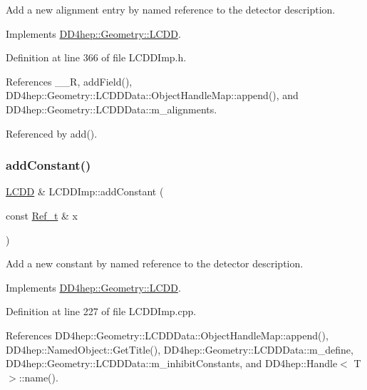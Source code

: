 Add a new alignment entry by named reference to the detector description. 



Implements \hyperlink{class_d_d4hep_1_1_geometry_1_1_l_c_d_d_a50e3654851b950da20f19a13e36fbcc4}{D\+D4hep\+::\+Geometry\+::\+L\+C\+DD}.



Definition at line 366 of file L\+C\+D\+D\+Imp.\+h.



References \+\_\+\+\_\+R, add\+Field(), D\+D4hep\+::\+Geometry\+::\+L\+C\+D\+D\+Data\+::\+Object\+Handle\+Map\+::append(), and D\+D4hep\+::\+Geometry\+::\+L\+C\+D\+D\+Data\+::m\+\_\+alignments.



Referenced by add().

\hypertarget{class_d_d4hep_1_1_geometry_1_1_l_c_d_d_imp_aec684bd86c26b609a33668364f595d96}{}\label{class_d_d4hep_1_1_geometry_1_1_l_c_d_d_imp_aec684bd86c26b609a33668364f595d96} 
\subsubsection{\texorpdfstring{add\+Constant()}{addConstant()}}
{\footnotesize\ttfamily \hyperlink{class_d_d4hep_1_1_geometry_1_1_l_c_d_d}{L\+C\+DD} \& L\+C\+D\+D\+Imp\+::add\+Constant (\begin{DoxyParamCaption}\item[{const \hyperlink{group___d_d4_h_e_p___g_e_o_m_e_t_r_y_ga40af83be6718bb8828a3d83dc7f8c930}{Ref\+\_\+t} \&}]{x }\end{DoxyParamCaption})\hspace{0.3cm}{\ttfamily [virtual]}}



Add a new constant by named reference to the detector description. 



Implements \hyperlink{class_d_d4hep_1_1_geometry_1_1_l_c_d_d_ac2bc82eba942bd452da56bbf958d8aad}{D\+D4hep\+::\+Geometry\+::\+L\+C\+DD}.



Definition at line 227 of file L\+C\+D\+D\+Imp.\+cpp.



References D\+D4hep\+::\+Geometry\+::\+L\+C\+D\+D\+Data\+::\+Object\+Handle\+Map\+::append(), D\+D4hep\+::\+Named\+Object\+::\+Get\+Title(), D\+D4hep\+::\+Geometry\+::\+L\+C\+D\+D\+Data\+::m\+\_\+define, D\+D4hep\+::\+Geometry\+::\+L\+C\+D\+D\+Data\+::m\+\_\+inhibit\+Constants, and D\+D4hep\+::\+Handle$<$ T $>$\+::name().



